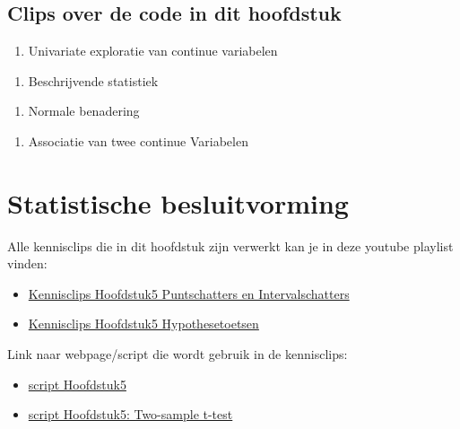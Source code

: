 \documentclass[
  dutch,
  letterpaper,
  12pt]{book}
\providecommand{\tightlist}{%
  \setlength{\itemsep}{0pt}\setlength{\parskip}{0pt}}
\theoremstyle{definition}
\theoremstyle{definition}
\theoremstyle{definition}
\theoremstyle{remark}
\begin{document}
\section{Clips over de code in dit
hoofdstuk}\label{clips-over-de-code-in-dit-hoofdstuk}

\begin{enumerate}
\def\labelenumi{\arabic{enumi}.}
\tightlist
\item
  Univariate exploratie van continue variabelen
\end{enumerate}

\begin{enumerate}
\def\labelenumi{\arabic{enumi}.}
\setcounter{enumi}{1}
\tightlist
\item
  Beschrijvende statistiek
\end{enumerate}

\begin{enumerate}
\def\labelenumi{\arabic{enumi}.}
\setcounter{enumi}{2}
\tightlist
\item
  Normale benadering
\end{enumerate}

\begin{enumerate}
\def\labelenumi{\arabic{enumi}.}
\setcounter{enumi}{3}
\tightlist
\item
  Associatie van twee continue Variabelen
\end{enumerate}


\chapter{Statistische besluitvorming}\label{sec-chap-besluit}

Alle kennisclips die in dit hoofdstuk zijn verwerkt kan je in deze
youtube playlist vinden:

\begin{itemize}
\item
  \href{https://www.youtube.com/playlist?list=PLZH1hP8_LbJKyD9Jw5cqd-btYs11f9tkz}{Kennisclips
  Hoofdstuk5 Puntschatters en Intervalschatters}
\item
  \href{https://www.youtube.com/playlist?list=PLZH1hP8_LbJKEtDy2errIWf8hLJODw-jK}{Kennisclips
  Hoofdstuk5 Hypothesetoetsen}
\end{itemize}

Link naar webpage/script die wordt gebruik in de kennisclips:

\begin{itemize}
\item
  \href{https://statomics.github.io/sbc/rmd/05-statisticalInference.html}{script
  Hoofdstuk5}
\item
  \href{https://statomics.github.io/sbc/rmd/05-statisticalInference-twosampleT.html}{script
  Hoofdstuk5: Two-sample t-test}
\end{itemize}
\end{document}
